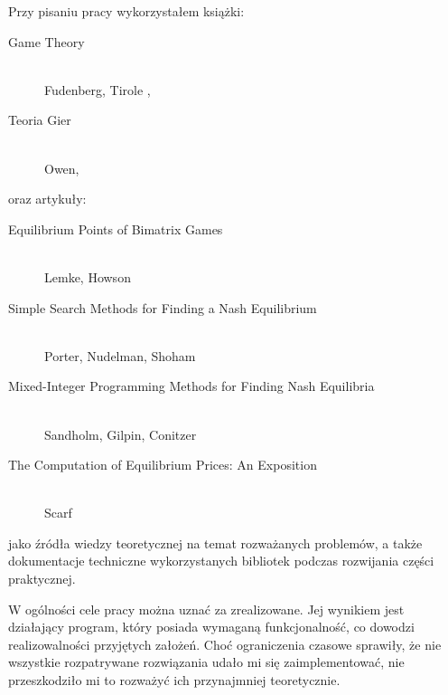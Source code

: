 \documentclass[polish]{standalone}
\begin{document}
Przy pisaniu pracy wykorzystałem książki:
\begin{description}
\item[Game Theory] \hfill \\ Fudenberg, Tirole \cite{FT-GT},
\item[Teoria Gier] \hfill \\ Owen, \cite{O-GT}
\end{description}
oraz artykuły:
\begin{description}
\item[Equilibrium Points of Bimatrix Games] \hfill \\ Lemke, Howson \cite{LH-NE}
\item[Simple Search Methods for Finding a Nash Equilibrium] \hfill \\ Porter, Nudelman, Shoham \cite{PNS-NE}
\item[Mixed-Integer Programming Methods for Finding Nash Equilibria] \hfill \\ Sandholm, Gilpin, Conitzer \cite{SCG-NE}
\item[The Computation of Equilibrium Prices: An Exposition] \hfill \\ Scarf \cite{SCARF-NR}
\end{description}
jako źródła wiedzy teoretycznej na temat rozważanych problemów, a także dokumentacje techniczne wykorzystanych bibliotek
podczas rozwijania części praktycznej.

W ogólności cele pracy można uznać za zrealizowane. Jej wynikiem jest działający program, który posiada wymaganą
funkcjonalność, co dowodzi realizowalności przyjętych założeń. Choć ograniczenia czasowe sprawiły, że nie wszystkie
rozpatrywane rozwiązania udało mi się zaimplementować, nie przeszkodziło mi to rozważyć ich przynajmniej teoretycznie.
\end{document}

